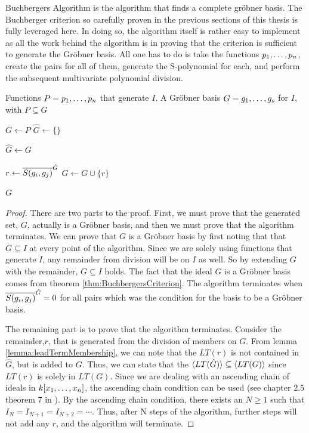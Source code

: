 Buchbergers Algorithm is the algorithm that finds a complete gröbner basis. The Buchberger criterion so carefully proven in the previous sections of this thesis is fully leveraged here. In doing so, the algorithm itself is rather easy to implement as all the work behind the algorithm is in proving that the criterion is sufficient to generate the Gröbner basis. All one has to do is take the functions $p_1, \dots, p_n$, create the pairs for all of them, generate the S-polynomial for each, and perform the subsequent multivariate polynomial division. 

\begin{algorithm}[ht]
\caption{Buchberger Algorithm}
\begin{algorithmic}[1]
\Require Functions $P = p_1, \dots, p_n$ that generate $I$.
\Ensure A Gröbner basis $G = g_1, \dots, g_s$ for $I$, with $P \subseteq G$

\State $ G \gets P$
\State $\hat{G} \gets \lbrace \rbrace$ 

    \State$\hat{G}  \gets G$

        \State $r \gets \overline{S(g_i, g_j)}^{\hat{G}}$
            \State $ G \gets G \cup \lbrace r \rbrace $
        \EndIf
    \EndFor
\EndWhile

\State \Return $ G$
\end{algorithmic}
\end{algorithm}

\begin{proof}
    There are two parts to the proof. First, we must prove that the generated set, $G$, actually is a Gröbner basis, and then we must prove that the algorithm terminates. We can prove that $G$ is a Gröbner basis by first noting that that $G \subseteq I$ at every point of the algorithm. Since we are solely using functions that generate $I$, any remainder from division will be on $I$ as well. So by extending $G$ with the remainder, $G \subseteq I$ holds. The fact that the ideal $G$ is a Gröbner basis comes from theorem \ref{thm:BuchbergersCriterion}. The algorithm terminates when $\overline{S(g_i, g_j)}^{\hat{G}} = 0$ for all pairs which was the condition for the basis to be a Gröbner basis. 
    
    The remaining part is to prove that the algorithm terminates. Consider the remainder,$r$, that is generated from the division of members on $G$. From lemma \ref{lemma:leadTermMembership}, we can note that the $LT(r)$ is not contained in $\hat{G}$, but is added to $G$. Thus, we can state that the $\langle LT(\hat{G}) \rangle \subseteq \langle LT(G) \rangle$ since $LT(r)$ is solely in $LT(G)$. Since we are dealing with an ascending chain of ideals in $k\lbrack x_1, \dots, x_n \rbrack$, the ascending chain condition can be used (see chapter 2.5 theorem 7 in \cite{Applied}). By the ascending chain condition, there exists an $N \geq 1$ such that $I_N = I_{N+1} = I_{N+2} = \cdots$. Thus, after N steps of the algorithm, further steps will not add any $r$, and the algorithm will terminate. 
\end{proof}

